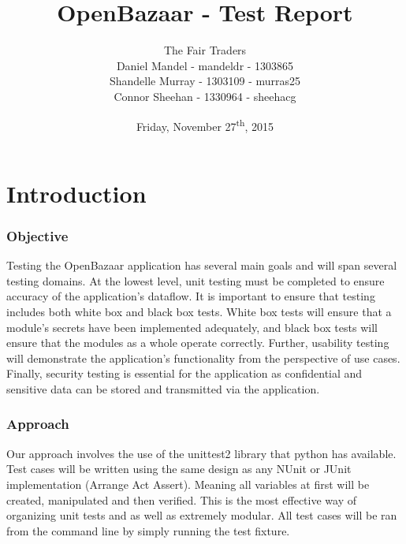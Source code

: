 \documentclass{article}
\begin{document}
\title{OpenBazaar - Test Report}
\author{The Fair Traders\\Daniel Mandel - mandeldr - 1303865\\Shandelle Murray - 1303109 - murras25\\Connor Sheehan - 1330964 - sheehacg}
\date{Friday, November 27\textsuperscript{th}, 2015}
\maketitle


\newpage
\tableofcontents
\newpage

\part*{Introduction}
\section{Objective}
Testing the OpenBazaar application has several main goals and will span several testing domains. At the lowest level, unit testing must be completed to ensure accuracy of the application's dataflow. It is important to ensure that testing includes both white box and black box tests. White box tests will ensure that a module's secrets have been implemented adequately, and black box tests will ensure that the modules as a whole operate correctly. Further, usability testing will demonstrate the application's functionality from the perspective of use cases. Finally, security testing is essential for the application as confidential and sensitive data can be stored and transmitted via the application.

\section{Approach}
Our approach involves the use of the unittest2 library that python has available. Test cases will be written using the same design as any NUnit or JUnit implementation (Arrange Act Assert). Meaning all variables at first will be created, manipulated and then verified. This is the most effective way of organizing unit tests and as well as extremely modular. All test cases will be ran from the command line by simply running the test fixture.
\end{document}
